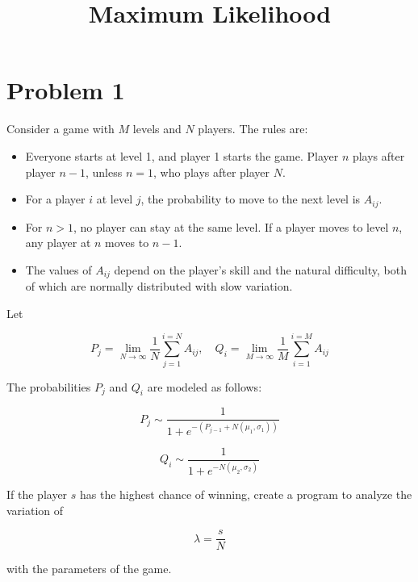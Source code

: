 \documentclass{article}
\begin{document}
\title{Maximum Likelihood}
\author{}
\date{}
\maketitle

\section*{Problem 1}

Consider a game with $M$ levels and $N$ players. The rules are:
\begin{itemize}
    \item Everyone starts at level 1, and player 1 starts the game. Player $n$ plays after player $n-1$, unless $n=1$, who plays after player $N$.
    \item For a player $i$ at level $j$, the probability to move to the next level is $A_{ij}$.
    \item For $n > 1$, no player can stay at the same level. If a player moves to level $n$, any player at $n$ moves to $n-1$.
    \item The values of $A_{ij}$ depend on the player's skill and the natural difficulty, both of which are normally distributed with slow variation.
\end{itemize}

Let 


\[
P_j = \lim_{N \rightarrow \infty} \frac{1}{N} \sum_{j=1}^{i=N} A_{ij}, \quad Q_i = \lim_{M \rightarrow \infty} \frac{1}{M} \sum_{i=1}^{i=M} A_{ij}
\]



The probabilities $P_j$ and $Q_i$ are modeled as follows:


\[
P_j \sim \frac{1}{1 + e^{-\left( P_{j-1} + N(\mu_1, \sigma_1) \right)}}
\]




\[
Q_i \sim \frac{1}{1 + e^{-N(\mu_2, \sigma_2)}}
\]



If the player $s$ has the highest chance of winning, create a program to analyze the variation of 


\[
\lambda = \frac{s}{N}
\]


with the parameters of the game.
\end{document}
